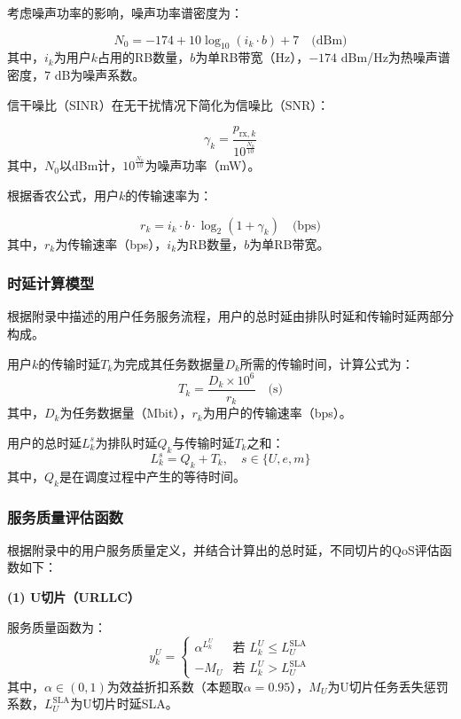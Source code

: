 考虑噪声功率的影响，噪声功率谱密度为：

\begin{equation}
N_0 = -174 + 10\log_{10}(i_k \cdot b) + 7 \quad \text{(dBm)}
\end{equation}
其中，$i_k$为用户$k$占用的RB数量，$b$为单RB带宽（Hz），$-174$ dBm/Hz为热噪声谱密度，$7$ dB为噪声系数。

信干噪比（SINR）在无干扰情况下简化为信噪比（SNR）：

\begin{equation}
\gamma_k = \frac{p_{\text{rx},k}}{10^{\frac{N_0}{10}}}
\end{equation}
其中，$N_0$以dBm计，$10^{\frac{N_0}{10}}$为噪声功率（mW）。

根据香农公式，用户$k$的传输速率为：

\begin{equation}
r_k = i_k \cdot b \cdot \log_2(1 + \gamma_k) \quad \text{(bps)}
\end{equation}
其中，$r_k$为传输速率（bps），$i_k$为RB数量，$b$为单RB带宽。

\subsubsection{时延计算模型}
根据附录中描述的用户任务服务流程，用户的总时延由排队时延和传输时延两部分构成。

用户$k$的传输时延$T_k$为完成其任务数据量$D_k$所需的传输时间，计算公式为：
\begin{equation}
T_k = \frac{D_k \times 10^6}{r_k} \quad \text{(s)}
\end{equation}
其中，$D_k$为任务数据量（Mbit），$r_k$为用户的传输速率（bps）。

用户的总时延$L_k^s$为排队时延$Q_k$与传输时延$T_k$之和：
\begin{equation}
L_k^{s} = Q_k + T_k, \quad s \in \{U, e, m\}
\end{equation}
其中，$Q_k$是在调度过程中产生的等待时间。

\subsubsection{服务质量评估函数}

根据附录中的用户服务质量定义，并结合计算出的总时延，不同切片的QoS评估函数如下：

\textbf{(1) U切片（URLLC）}

服务质量函数为：
\begin{equation}
y_k^{U} = \begin{cases}
\alpha^{L_k^{U}} & \text{若 } L_k^{U} \leq L_{U}^{\text{SLA}} \\
-M_{U} & \text{若 } L_k^{U} > L_{U}^{\text{SLA}}
\end{cases}
\end{equation}
其中，$\alpha\in(0,1)$为效益折扣系数（本题取$\alpha=0.95$），$M_U$为U切片任务丢失惩罚系数，$L_U^{\text{SLA}}$为U切片时延SLA。

